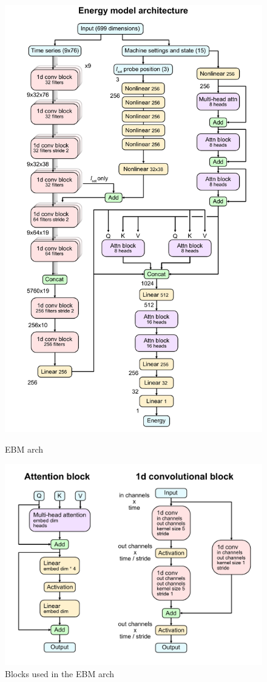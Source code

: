 \begin{figure}
	\centering
	\includegraphics[height=550pt]{figures/architecture.pdf}
	\caption{\label{fig:architecture}EBM arch}
\end{figure}

\begin{figure}
	\centering
	\includegraphics[width=\linewidth]{figures/architecture_blocks.pdf}
	\caption{\label{fig:architecture_blocks}Blocks used in the EBM arch}
\end{figure}

